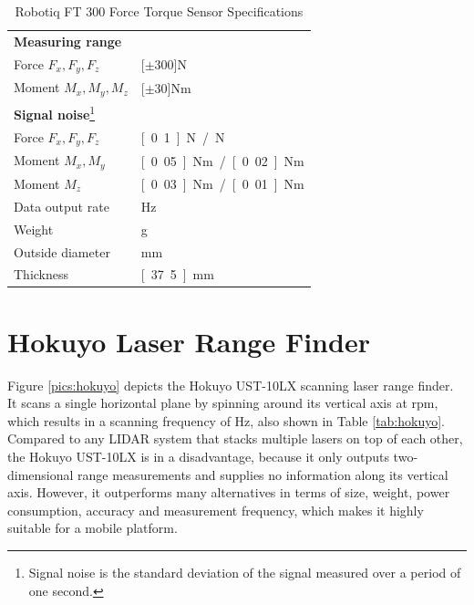 \begin{savenotes}
\begin{table}[h]
\begin{center}
 \caption{Robotiq FT 300 Force Torque Sensor Specifications}\vspace{1ex}
 \label{tab:robotiq_ft}
 \begin{tabular}{ll}
 \hline
 \textbf{Measuring range} & \\
 Force $F_x, F_y, F_z$ & \unit[$\pm 300$]{N} \\
 Moment $M_x, M_y, M_z$ & \unit[$\pm 30$]{Nm} \\ \hline
 \textbf{Signal noise}\footnote{Signal noise is the standard deviation of the signal measured over a period of one second.} &\\
 Force $F_x, F_y, F_z$ & \unit[0.1]{N} / \unit[1]{N} \\
 Moment $M_x, M_y$ & \unit[0.05]{Nm} / \unit[0.02]{Nm} \\
 Moment $M_z$ & \unit[0.03]{Nm} / \unit[0.01]{Nm} \\ \hline
 Data output rate & \unit[100]{Hz} \\
 Weight & \unit[300]{g}\\
 Outside diameter & \unit[75]{mm} \\
 Thickness & \unit[37.5]{mm} \\
 \hline
 \end{tabular}
\end{center}
\end{table}
\end{savenotes}

\section{Hokuyo Laser Range Finder}
Figure \ref{pics:hokuyo} depicts the Hokuyo UST-10LX scanning laser range finder. It scans a single horizontal plane by spinning around its vertical axis at \unit[2400]{rpm}, which results in a scanning frequency of \unit[40]{Hz}, also shown in Table \ref{tab:hokuyo}. Compared to any LIDAR system that stacks multiple lasers on top of each other, the Hokuyo UST-10LX is in a disadvantage, because it only outputs two-dimensional range measurements and supplies no information along its vertical axis. However, it outperforms many alternatives in terms of size, weight, power consumption, accuracy and measurement frequency, which makes it highly suitable for a mobile platform.


